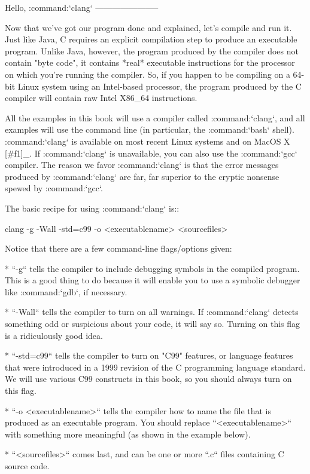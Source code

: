 Hello, :command:`clang`
-----------------------

Now that we've got our program done and explained, let's compile and run it.  Just like Java, C requires an explicit compilation step to produce an executable program.  Unlike Java, however, the program produced by the compiler does not contain "byte code", it contains *real* executable instructions for the processor on which you're running the compiler.  So, if you happen to be compiling on a 64-bit Linux system using an Intel-based processor, the program produced by the C compiler will contain raw Intel X86_64 instructions.

All the examples in this book will use a compiler called :command:`clang`, and all examples will use the command line (in particular, the :command:`bash` shell). :command:`clang` is available on most recent Linux systems and on MacOS X [#f1]_.  If :command:`clang` is unavailable, you can also use the :command:`gcc` compiler.  The reason we favor :command:`clang` is that the error messages produced by :command:`clang` are far, far superior to the cryptic nonsense spewed by :command:`gcc`.

The basic recipe for using :command:`clang` is::

    clang -g -Wall -std=c99 -o <executablename> <sourcefiles>

Notice that there are a few command-line flags/options given:

 * ``-g`` tells the compiler to include debugging symbols in the compiled program.  This is a good thing to do because it will enable you to use a symbolic debugger like :command:`gdb`, if necessary.

 * ``-Wall`` tells the compiler to turn on all warnings.  If :command:`clang` detects something odd or suspicious about your code, it will say so.  Turning on this flag is a ridiculously good idea.

 * ``-std=c99`` tells the compiler to turn on "C99" features, or language features that were introduced in a 1999 revision of the C programming language standard.  We will use various C99 constructs in this book, so you should always turn on this flag.

 * ``-o <executablename>`` tells the compiler how to name the file that is produced as an executable program.  You should replace ``<executablename>`` with something more meaningful (as shown in the example below).

 * ``<sourcefiles>`` comes last, and can be one or more ``.c`` files containing C source code.   

